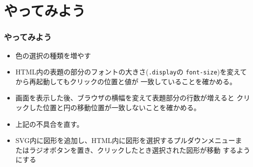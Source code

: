  \section{やってみよう}
\begin{frame}[containsverbatim]
  \frametitle{やってみよう}
 \begin{itemize}
  \item 色の選択の種類を増やす
  \item HTML内の表題の部分のフォントの大きさ(\texttt{.display}の
        \texttt{font-size})を変えてから再起動してもクリックの位置と値が
        一致していることを確かめる。
  \item 画面を表示した後、ブラウザの横幅を変えて表題部分の行数が増えると
        クリックした位置と円の移動位置が一致しないことを確かめる。
  \item 上記の不具合を直す。
  \item SVG内に図形を追加し、HTML内に図形を選択するプルダウンメニューま
        たはラジオボタンを置き、クリックしたとき選択された図形が移動
        するようにする
 \end{itemize}
\end{frame}

\begin{frame}[containsverbatim]
 \frametitle{}
\end{frame}
